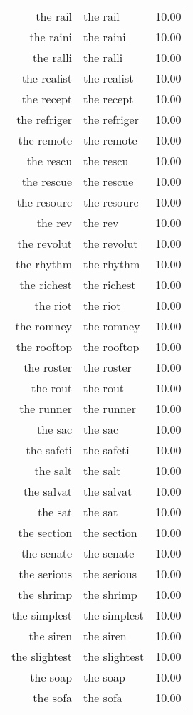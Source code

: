 \begin{table}[ht]
\begin{tabular}{rlr}
  the rail & the rail & 10.00 \\ 
  the raini & the raini & 10.00 \\ 
  the ralli & the ralli & 10.00 \\ 
  the realist & the realist & 10.00 \\ 
  the recept & the recept & 10.00 \\ 
  the refriger & the refriger & 10.00 \\ 
  the remote & the remote & 10.00 \\ 
  the rescu & the rescu & 10.00 \\ 
  the rescue & the rescue & 10.00 \\ 
  the resourc & the resourc & 10.00 \\ 
  the rev & the rev & 10.00 \\ 
  the revolut & the revolut & 10.00 \\ 
  the rhythm & the rhythm & 10.00 \\ 
  the richest & the richest & 10.00 \\ 
  the riot & the riot & 10.00 \\ 
  the romney & the romney & 10.00 \\ 
  the rooftop & the rooftop & 10.00 \\ 
  the roster & the roster & 10.00 \\ 
  the rout & the rout & 10.00 \\ 
  the runner & the runner & 10.00 \\ 
  the sac & the sac & 10.00 \\ 
  the safeti & the safeti & 10.00 \\ 
  the salt & the salt & 10.00 \\ 
  the salvat & the salvat & 10.00 \\ 
  the sat & the sat & 10.00 \\ 
  the section & the section & 10.00 \\ 
  the senate & the senate & 10.00 \\ 
  the serious & the serious & 10.00 \\ 
  the shrimp & the shrimp & 10.00 \\ 
  the simplest & the simplest & 10.00 \\ 
  the siren & the siren & 10.00 \\ 
  the slightest & the slightest & 10.00 \\ 
  the soap & the soap & 10.00 \\ 
  the sofa & the sofa & 10.00 \\ 

\end{tabular}
\end{table}
